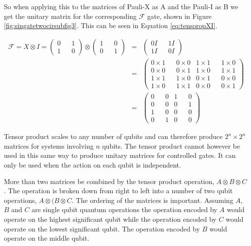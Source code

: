 So when applying this to the matrices of Pauli-X as A and the Pauli-I as B we get the unitary matrix for the corresponding $\mathcal{F}$ gate, shown in Figure \ref{fig:singatetwocirsubfig3}.
This can be seen in Equation \ref{eq:tensoropXI}.

\begin{eqnarray}
  \mathcal{F} =
X \otimes I =
\begin{pmatrix}
0 && 1\\
1 && 0
\end{pmatrix}
\otimes
\begin{pmatrix}
1 && 0 \\
0 && 1
\end{pmatrix} & = & \begin{pmatrix}
0I && 1I \\
1I && 0I
\end{pmatrix}  \nonumber \\
   & = & \begin{pmatrix}
0\times{1} && 0\times{0} & 1\times{1} && 1\times{0}\\
0\times{0} && 0\times{1} & 1\times{0} && 1\times{1}\\
1\times{1} && 1\times{0} & 0\times{1} && 0\times{0}\\
1\times{0} && 1\times{1} & 0\times{0} && 0\times{1}
\end{pmatrix} \nonumber  \\
   & = & \begin{pmatrix}
0 && 0 & 1 && 0\\
0 && 0 & 0 && 1\\
1 && 0 & 0 && 0\\
0 && 1 & 0 && 0
\end{pmatrix}
\label{eq:tensoropXI}
\end{eqnarray}

Tensor product scales to any number of qubits and can therefore produce $2^n\times{2^n}$ matrices for systems involving $n$ qubits.
The tensor product cannot however be used in this same way to produce unitary matrices for controlled gates.
It can only be used when the action on each qubit is independent.

More than two matrices be combined by the tensor product operation, $A\otimes{B}\otimes{C}$.
The operation is broken down from right to left into a number of two qubit operations, $A\otimes(B\otimes{C}$.
The ordering of the matrices is important.
Assuming $A$, $B$ and $C$ are single qubit quantum operations the operation encoded by $A$ would operate on the highest significant qubit while the operation encoded by $C$ would operate on the lowest significant qubit.
The operation encoded by $B$ would operate on the middle qubit.

